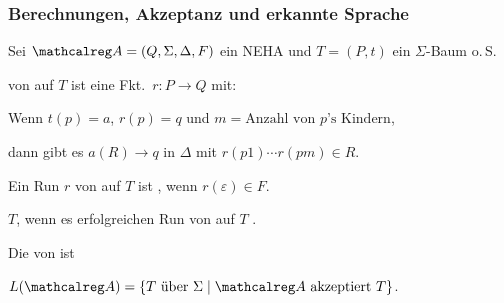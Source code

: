     \begin{frame}[t]
      \frametitle{Berechnungen, Akzeptanz und erkannte Sprache}
      \addtocounter{theorem}{-1}
      \begin{Definition}[Fortsetzung]
        Sei $\Aut{A} = (Q,\Sigma,\Delta,F)$ ein NEHA und $T=(P,t)$ ein $\Sigma$-Baum o.\,S.
        \begin{Itemize}
          \item
             von  auf $T$
            ist eine Fkt.\ $r : P \to Q$ mit:
            \begin{Itemize}
              \item[]
                Wenn $t(p) = a$, $r(p) = q$ und $m = \text{Anzahl von $p$'s Kindern}$,
                \par\smallskip
                dann gibt es $a(R) \to q$ in $\Delta$ mit $r(p1)\cdots r(pm) \in R$.
            \end{Itemize}
            \par\smallskip
          \item
            Ein Run $r$ von  auf $T$ ist , wenn $r(\varepsilon) \in F$.
          \item
              $T$, wenn es erfolgreichen Run von  auf $T$ .
          \item
            Die von   ist
            \par
            $L(\Aut{A}) = \{T \text{~über~} \Sigma \mid \Aut{A} \text{~akzeptiert~} T\}$.
        \end{Itemize}
      \end{Definition}

%
    \end{frame}
    
